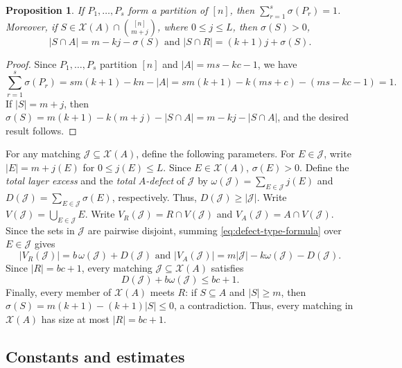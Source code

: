 \documentclass[10pt,a4paper]{article}
\numberwithin{equation}{section}
\newtheorem{proposition}[proposition]{Proposition}
\theoremstyle{definition}
\newcommand{\X}{\mathcal X}
\begin{document}
\begin{proposition}
        If $P_1,\ldots,P_s$ form a partition of $[n]$, then $\sum_{r=1}^{s}\sigma(P_r)=1$.
        Moreover, if $S\in\X(A)\cap\binom{[n]}{m+j}$, where $0\le j\le L$, then $\sigma(S)>0$,
        \begin{equation}\label{eq:defect-type-formula}
                |S\cap A|=m-kj-\sigma(S) \text{ and }
                |S\cap R|=(k+1)j+\sigma(S).
        \end{equation}
\end{proposition}

\begin{proof}
        Since $P_1,\ldots,P_s$ partition $[n]$ and $|A|=ms-kc-1$, we have
        \[
                \sum_{r=1}^s\sigma(P_r)
                =sm(k+1)-kn-|A|
                =sm(k+1)-k(ms+c)-(ms-kc-1)=1.
        \]
        If $|S|=m+j$, then $\sigma(S)=m(k+1)-k(m+j)-|S\cap A|=m-kj-|S\cap A|$, and the desired result follows.
\end{proof}

For any matching $\mathcal J\subseteq\X(A)$, define the following parameters.
For $E\in\mathcal J$, write $|E|=m+j(E)$ for $0\le j(E)\le L$.
Since $E\in\X(A)$, $\sigma(E)>0$.
Define the \emph{total layer excess} and the \emph{total $A$-defect} of $\mathcal J$ by
$\omega(\mathcal J)=\sum_{E\in\mathcal J}j(E)$ and
$D(\mathcal J)=\sum_{E\in\mathcal J}\sigma(E)$, respectively.
Thus, $D(\mathcal J)\ge|\mathcal J|$.
Write $V(\mathcal J)=\bigcup_{E\in\mathcal J}E$.
Write $V_R(\mathcal J)=R\cap V(\mathcal J)$ and $V_A(\mathcal J)=A\cap V(\mathcal J)$.
Since the sets in $\mathcal J$ are pairwise disjoint, summing \eqref{eq:defect-type-formula} over $E\in\mathcal J$ gives
\begin{equation}\label{eq:defect-J-support}
        |V_R(\mathcal J)|=b\,\omega(\mathcal J)+D(\mathcal J) \text{ and }
        |V_A(\mathcal J)|=m|\mathcal J|-k\omega(\mathcal J)-D(\mathcal J).
\end{equation}
Since $|R|=bc+1$, every matching $\mathcal J\subseteq\X(A)$ satisfies
\begin{equation}\label{eq:defect-R-capacity}
        D(\mathcal J)+b\omega(\mathcal J)\le bc+1.
\end{equation}
Finally, every member of $\X(A)$ meets $R$: if $S\subseteq A$ and $|S|\ge m$, then $\sigma(S)=m(k+1)-(k+1)|S|\le0$, a contradiction.
Thus, every matching in $\X(A)$ has size at most $|R|=bc+1$.



\subsection{Constants and estimates}
\end{document}
